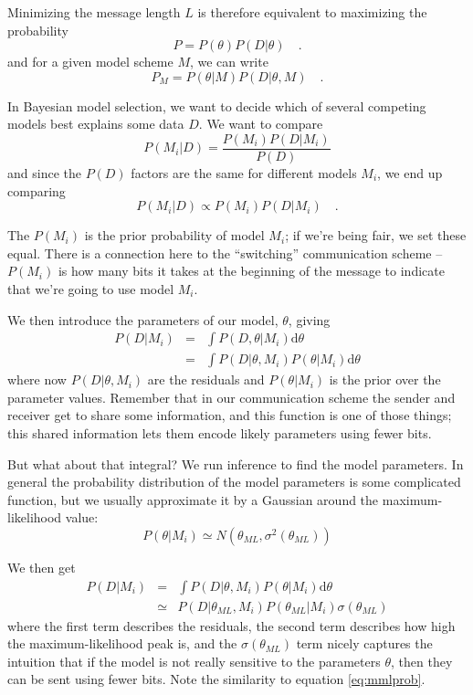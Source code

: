 \documentclass[letterpaper]{article}
\newcommand{\dd}{\mathrm{d}}
\begin{document}
Minimizing the message length $L$ is therefore equivalent to maximizing the
probability
\[ P = P(\theta) P(D | \theta) \quad . \]
and for a given model scheme $M$, we can write
\begin{equation}
P_M = P(\theta | M) P(D | \theta, M) \quad .
\label{eq:mmlprob}
\end{equation}

\vspace{12pt}

In Bayesian model selection, we want to decide which of several competing models
best explains some data $D$.
We want to compare
\[ P(M_i | D) = \frac{P(M_i) P(D | M_i)}{P(D)} \]
and since the $P(D)$ factors are the same for different models $M_i$,
we end up comparing
\[ P(M_i | D) \propto P(M_i) P(D | M_i) \quad . \]

The $P(M_i)$ is the prior probability of model $M_i$; if we're being fair, we set
these equal.  There is a connection here to the ``switching'' communication scheme --
$P(M_i)$ is how many bits it takes at the beginning of the message to indicate that
we're going to use model $M_i$.

We then introduce the parameters of our model, $\theta$, giving
\begin{eqnarray}
  P(D | M_i) &=& \int P(D, \theta | M_i) \dd\theta \\
  & = & \int P(D | \theta, M_i) P(\theta | M_i) \dd\theta
\end{eqnarray}
where now $P(D | \theta, M_i)$ are the residuals and $P(\theta | M_i)$ is the
prior over the parameter values.  Remember that in our communication scheme the
sender and receiver get to share some information, and this function is one of
those things; this shared information lets them encode likely parameters using
fewer bits.

But what about that integral?  We run inference to find the model parameters.  In
general the probability distribution of the model parameters is some complicated
function, but we usually approximate it by a Gaussian around the maximum-likelihood
value:
\[ P(\theta | M_i) \simeq N( \theta_{ML}, \sigma^2(\theta_{ML}) ) \]

We then get
\begin{eqnarray}
 P(D | M_i) &=& \int P(D | \theta, M_i) P(\theta | M_i) \dd\theta \\
 & \simeq & P(D | \theta_{ML}, M_i) P(\theta_{ML} | M_i) \sigma(\theta_{ML})
\end{eqnarray}
where the first term describes the residuals, the second term describes how
high the maximum-likelihood peak is, and the $\sigma(\theta_{ML})$ term nicely
captures the intuition that if the model
is not really sensitive to the parameters $\theta$, then they can be sent using fewer
bits.  Note the similarity to equation \ref{eq:mmlprob}.
\end{document}
